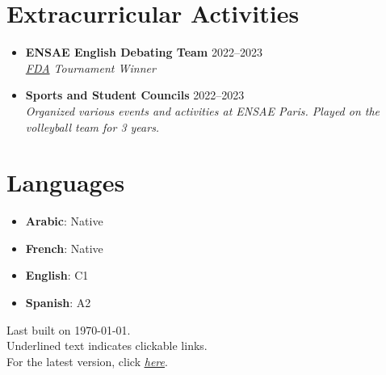 \documentclass[letterpaper,11pt,twocolumn]{article}
\newcommand{\resumeSubheading}[4]{
  \vspace{-2pt}\item \textbf{#1} \hfill #2 \\
  \textit{\small #3} \hfill \textit{\small #4} 
  \vspace{-7pt}
}
\begin{document}
\section{Extracurricular Activities}
\begin{itemize}[leftmargin=*]
  \resumeSubheading
    {ENSAE English Debating Team}{2022--2023}{\href{https://www.frenchdebatingassociation.fr/#fda}{FDA} Tournament Winner}{}
  \resumeSubheading
    {Sports and Student Councils}{2022--2023}{Organized various events and activities at ENSAE Paris. Played on the volleyball team for 3 years.}{}
\end{itemize}

\section{Languages}
\begin{itemize}[leftmargin=*]
  \item \textbf{Arabic}: Native
  \item \textbf{French}: Native
  \item \textbf{English}: C1
  \item \textbf{Spanish}: A2
\end{itemize}

\begin{flushright}
  \vspace{-4pt}
  \color{gray}
  Last built on \today.  \\
  Underlined text indicates clickable links. \\
  For the latest version, click \href{https://machtayassine.github.io/resume/resume_ymachta.pdf}{\underline{\textit{here}}}.
\end{flushright}
\end{document}
